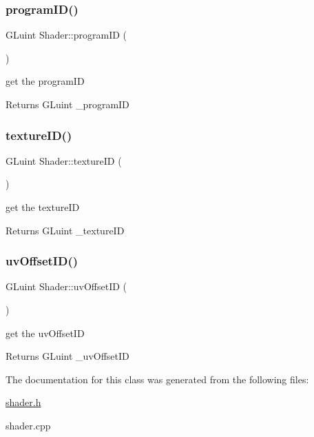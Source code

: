 \subsubsection{\texorpdfstring{program\+I\+D()}{programID()}}
{\footnotesize\ttfamily G\+Luint Shader\+::program\+ID (\begin{DoxyParamCaption}{ }\end{DoxyParamCaption})\hspace{0.3cm}{\ttfamily [inline]}}



get the program\+ID 

\begin{DoxyReturn}{Returns}
G\+Luint \+\_\+program\+ID 
\end{DoxyReturn}
\mbox{\label{class_shader_abccab59f58d517c4c2ac392f522b0675}} 
\subsubsection{\texorpdfstring{texture\+I\+D()}{textureID()}}
{\footnotesize\ttfamily G\+Luint Shader\+::texture\+ID (\begin{DoxyParamCaption}{ }\end{DoxyParamCaption})\hspace{0.3cm}{\ttfamily [inline]}}



get the texture\+ID 

\begin{DoxyReturn}{Returns}
G\+Luint \+\_\+texture\+ID 
\end{DoxyReturn}
\mbox{\label{class_shader_af2060ae1c85d8db67389c8116a02d9dd}} 
\subsubsection{\texorpdfstring{uv\+Offset\+I\+D()}{uvOffsetID()}}
{\footnotesize\ttfamily G\+Luint Shader\+::uv\+Offset\+ID (\begin{DoxyParamCaption}{ }\end{DoxyParamCaption})\hspace{0.3cm}{\ttfamily [inline]}}



get the uv\+Offset\+ID 

\begin{DoxyReturn}{Returns}
G\+Luint \+\_\+uv\+Offset\+ID 
\end{DoxyReturn}


The documentation for this class was generated from the following files\+:\begin{DoxyCompactItemize}
\item 
\hyperlink{shader_8h}{shader.\+h}\item 
shader.\+cpp\end{DoxyCompactItemize}
